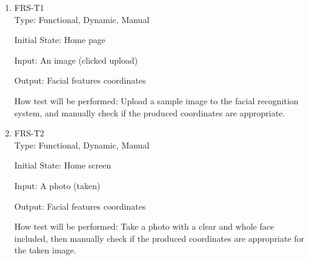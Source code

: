\documentclass[12pt, titlepage]{article}
\begin{document}
\begin{enumerate}

\item{FRS-T1\\}
Type: Functional, Dynamic, Manual
					
Initial State: Home page
					
Input: An image (clicked upload)
					
Output: Facial features coordinates

How test will be performed: Upload a sample image to the facial recognition system, and manually check if the produced coordinates are appropriate.
					
\item{FRS-T2\\}
Type: Functional, Dynamic, Manual
                    
Initial State: Home screen
					
Input: A photo (taken)
					
Output: Facial features coordinates
					
How test will be performed: Take a photo with a clear and whole face included, then manually check if the produced coordinates are appropriate for the taken image. 

\end{enumerate}
\end{document}
